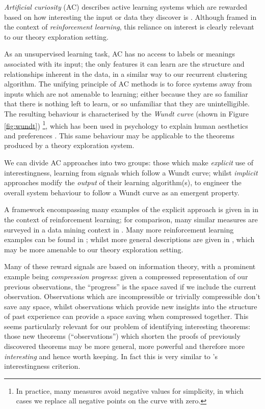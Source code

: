 \emph{Artificial curiosity} (AC) describes active learning systems which are
rewarded based on how interesting the input or data they discover is
\cite{schmidhuber2006developmental}. Although framed in the context of
\emph{reinforcement learning}, this reliance on interest is clearly relevant to
our theory exploration setting.

As an unsupervised learning task, AC has no access to labels or meanings
associated with its input; the only features it can learn are the structure and
relationships inherent in the data, in a similar way to our recurrent clustering
algorithm. The unifying principle of AC methods is to force systems away from
inputs which are not amenable to learning; either because they are so familiar
that there is nothing left to learn, or so unfamiliar that they are
unintelligible. The resulting behaviour is characterised by the \emph{Wundt
  curve} (shown in Figure \ref{fig:wundt}) \footnote{In practice, many measures
  avoid negative values for simplicity, in which cases we replace all negative
  points on the curve with zero.}, which has been used in psychology to explain
human aesthetics and preferences \cite{berlyne1970novelty}. This same behaviour
may be applicable to the theorems produced by a theory exploration system.

We can divide AC approaches into two groups: those which make \emph{explicit}
use of interestingness, learning from signals which follow a Wundt curve; whilst
\emph{implicit} approaches modify the \emph{output} of their learning
algorithm(s), to engineer the overall system behaviour to follow a Wundt curve
as an emergent property.

A framework encompassing many examples of the explicit approach is given in
\cite{oudeyer2007intrinsic} in the context of reinforcement learning; for
comparison, many similar measures are surveyed in a data mining context in
\cite{geng2006interestingness}. Many more reinforcement learning examples can
be found in \cite{Kaplan2006, Lipson2007, Luciw2011, Macedo2000,
  Ramik.Sabourin.Madani:2013, Roa.Kruijff.Jacobsson:2009, Schmidhuber:1991,
  oudeyer2004intelligent}; whilst more general descriptions are given in
\cite{Schaul.Sun.Wierstra.ea:2011, Scott1989, maher2008achieving}, which may be
more amenable to our theory exploration setting.

Many of these reward signals are based on information theory, with a prominent
example being \emph{compression progress}: given a compressed representation of
our previous observations, the ``progress'' is the space saved if we include the
current observation. Observations which are incompressible or trivially
compressible don't save any space, whilst observations which provide new
insights into the structure of past experience can provide a space saving when
compressed together. This seems particularly relevant for our problem of
identifying interesting theorems: those new theorems (``observations'') which
shorten the proofs of previously discovered theorems may be more general, more
powerful and therefore more \emph{interesting} and hence worth keeping. In fact
this is very similar to \qspec{}'s interestingness criterion.

